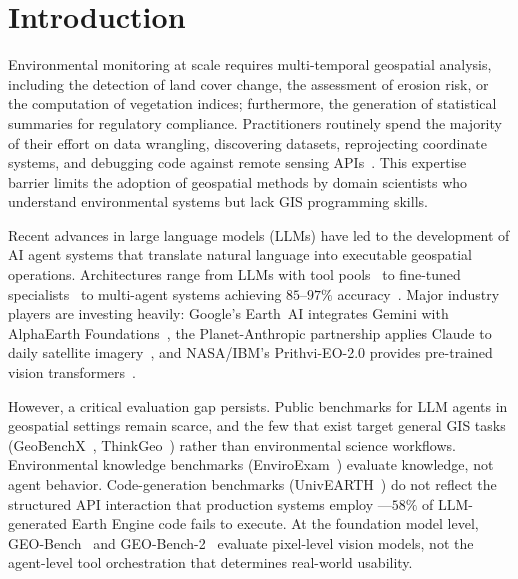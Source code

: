 \documentclass[sigconf]{acmart}
\begin{document}

\maketitle


\section{Introduction}
\label{sec:intro}

Environmental monitoring at scale requires multi-temporal geospatial analysis, including the detection of land cover change, the assessment of erosion risk, or the computation of vegetation indices; furthermore, the generation of statistical summaries for regulatory compliance. Practitioners routinely spend the majority of their effort on data wrangling, discovering datasets, reprojecting coordinate systems, and debugging code against remote sensing APIs~\cite{zhang2023geogpt, li2023llmgeo}. This expertise barrier limits the adoption of geospatial methods by domain scientists who understand environmental systems but lack GIS programming skills.

Recent advances in large language models (LLMs) have led to the development of AI agent systems that translate natural language into executable geospatial operations. Architectures range from LLMs with tool pools~\citep{zhang2023geogpt, akinboyewa2024giscopilot} to fine-tuned specialists~\citep{zhang2024gtchain, zhang2025envgpt} to multi-agent systems achieving $85$--$97\%$ accuracy~\citep{luo2025geojsonagents, lee2025geollmsquad}. Major industry players are investing heavily: Google's Earth~AI integrates Gemini with AlphaEarth Foundations~\citep{google2025earthai}, the Planet-Anthropic partnership applies Claude to daily satellite imagery~\citep{planet2025anthropic}, and NASA/IBM's Prithvi-EO-2.0 provides pre-trained vision transformers~\citep{szwarcman2024prithvi}.

However, a critical evaluation gap persists. Public benchmarks for LLM agents in geospatial settings remain scarce, and the few that exist target general GIS tasks (GeoBenchX~\citep{krechetova2025geobenchx}, ThinkGeo~\citep{shabbir2025thinkgeo}) rather than environmental science workflows. Environmental knowledge benchmarks (EnviroExam~\citep{huang2024enviroexam}) evaluate knowledge, not agent behavior. Code-generation benchmarks (UnivEARTH~\citep{kao2025univearth}) do not reflect the structured API interaction that production systems employ ---$58\%$ of LLM-generated Earth Engine code fails to execute. At the foundation model level, GEO-Bench~\citep{lacoste2023geobench} and GEO-Bench-2~\citep{simumba2025geobench2} evaluate pixel-level vision models, not the agent-level tool orchestration that determines real-world usability.
\end{document}
